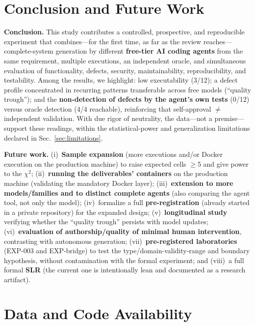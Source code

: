 \documentclass[11pt]{article}
\begin{document}
\section{Conclusion and Future Work}\label{sec:conclusion}

\textbf{Conclusion.} This study contributes a controlled, prospective, and reproducible experiment that combines---for the first time, as far as the review reaches---complete-system generation by different \textbf{free-tier AI coding agents} from the same requirement, multiple executions, an independent oracle, and simultaneous evaluation of functionality, defects, security, maintainability, reproducibility, and testability. Among the results, we highlight: low executability (3/12); a defect profile concentrated in recurring patterns transferable across free models (``quality trough''); and the \textbf{non-detection of defects by the agent's own tests} (0/12) versus oracle detection (4/4 reachable), reinforcing that self-approval $\neq$ independent validation. With due rigor of neutrality, the data---not a premise---support these readings, within the statistical-power and generalization limitations declared in Sec.~\ref{sec:limitations}.

\textbf{Future work.} (i)~\textbf{Sample expansion} (more executions and/or Docker execution on the production machine) to raise expected cells $\geq$5 and give power to the $\chi^2$; (ii)~\textbf{running the deliverables' containers} on the production machine (validating the mandatory Docker layer); (iii)~\textbf{extension to more models/families and to distinct complete agents} (also comparing the agent tool, not only the model); (iv)~formalize a full \textbf{pre-registration} (already started in a private repository) for the expanded design; (v)~\textbf{longitudinal study} verifying whether the ``quality trough'' persists with model updates; (vi)~\textbf{evaluation of authorship/quality of minimal human intervention}, contrasting with autonomous generation; (vii)~\textbf{pre-registered laboratories} (EXP-003 and EXP-bridge) to test the type/domain-validity-range and boundary hypothesis, without contamination with the formal experiment; and (viii)~a full formal \textbf{SLR} (the current one is intentionally lean and documented as a research artifact).

\section*{Data and Code Availability}
\end{document}
